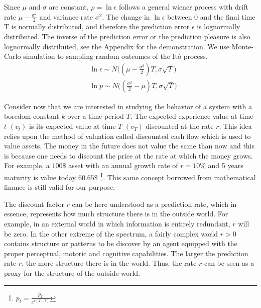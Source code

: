 \documentclass[11pt, onecolumn]{article}
\begin{document}
Since $\mu$ and $\sigma$ are constant, $\rho = \ln \epsilon$ follows a general wiener process with drift rate $\mu - \frac{\sigma^2}{2}$ and variance rate $\sigma^2$. The change in $ \ln \epsilon$ between 0 and the final time T is normally distributed, and therefore the prediction error $\epsilon$ is lognormally distributed. The inverse of the prediction error or the prediction pleasure is also lognormally distributed, see the Appendix for the demonstration. We use Monte-Carlo simulation to sampling random outcomes of the It\^{o} process.
\begin{equation}
\begin{split}
& \ln \epsilon \sim N \bigg((\mu -\frac{\sigma^2}{2})T, \sigma \sqrt{T}\bigg) \\
& \ln p \sim N\bigg( (\frac{\sigma^2}{2} - \mu)T, \sigma \sqrt{T} \bigg)
\end{split}
\label{eq:lgnp}
\end{equation}


Consider now that we are interested in studying the behavior of a system with a boredom constant $k$ over a time period $T$. The expected experience value at time $t$ $(v_t)$ is its expected value at time $T$ $(v_T)$ discounted at the rate $r$. This idea relies upon the method of valuation called discounted cash flow which is used to value assets. The money in the future does not value the same than now and  this is because one needs to discount the price at the rate at which the money grows. For example, a $100\$$ asset with an annual growth rate of $r=10\%$ and 5 years maturity is value today $60.65\$$ \footnote{$p_t = \frac{p_T}{e^{r(T-t)}}$}. This same concept borrowed from mathematical finance is still valid for our purpose.

The discount factor $r$ can be here understood as a prediction rate, which in essence, represents how much structure there is in the outside world. For example, in an external world in which information is entirely redundant, $r$ will be zero.
In the other extreme of the spectrum, a fairly complex world  $r >0$ contains  structure or patterns to be discover by an agent equipped with the proper perceptual, motoric and cognitive capabilities. The larger the prediction rate $r$, the more structure there is in the world. Thus, the rate $r$ can be seen as a proxy for the structure of the outside world. 
\end{document}
